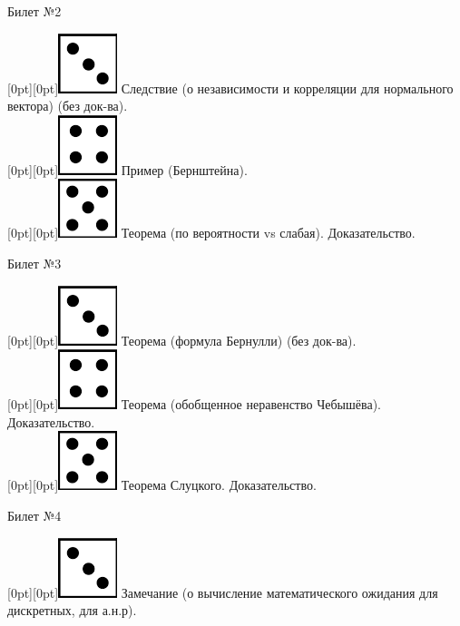 \documentclass[10pt]{article}
\begin{document}
\begin{center} {\Large Билет №2} \end{center} 

\raisebox{-1pt}[0pt][0pt]{\includegraphics[width=0.02\linewidth]{3.png}} Следствие (о независимости и корреляции для нормального вектора) (без док-ва). \\ 

\raisebox{-1pt}[0pt][0pt]{\includegraphics[width=0.02\linewidth]{4.png}}  Пример (Бернштейна). \\

\raisebox{-1pt}[0pt][0pt]{\includegraphics[width=0.02\linewidth]{5.png}} Теорема (по вероятности vs слабая). Доказательство. \\  

\begin{center} {\Large Билет №3} \end{center} 

\raisebox{-1pt}[0pt][0pt]{\includegraphics[width=0.02\linewidth]{3.png}} Теорема (формула Бернулли) (без док-ва). \\

\raisebox{-1pt}[0pt][0pt]{\includegraphics[width=0.02\linewidth]{4.png}} Теорема (обобщенное неравенство Чебышёва). Доказательство. \\

\raisebox{-1pt}[0pt][0pt]{\includegraphics[width=0.02\linewidth]{5.png}} Теорема Слуцкого. Доказательство. \\

\begin{center} {\Large Билет №4} \end{center} 

\raisebox{-1pt}[0pt][0pt]{\includegraphics[width=0.02\linewidth]{3.png}} Замечание (о вычисление  математического ожидания для дискретных, для а.н.р). \\
\end{document}
